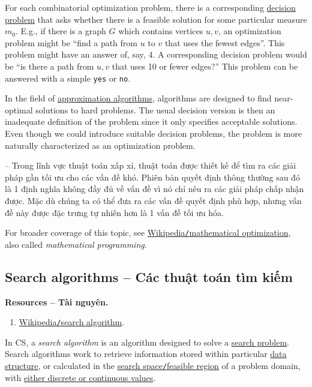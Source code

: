 \documentclass{article}
\begin{document}
For each combinatorial optimization problem, there is a corresponding \href{https://en.wikipedia.org/wiki/Decision_problem}{decision problem} that asks whether there is a feasible solution for some particular measure $m_0$. E.g., if there is a graph $G$ which contains vertices $u,v$, an optimization problem might be ``find a path from $u$ to $v$ that uses the fewest edges''. This problem might have an answer of, say, 4. A corresponding decision problem would be ``is there a path from $u,v$ that uses 10 or fewer edges?'' This problem can be answered with a simple {\tt yes} or {\tt no}.

In the field of \href{https://en.wikipedia.org/wiki/Approximation_algorithm}{approximation algorithms}, algorithms are designed to find near-optimal solutions to hard problems. The usual decision version is then an inadequate definition of the problem since it only specifies acceptable solutions. Even though we could introduce suitable decision problems, the problem is more naturally characterized as an optimization problem.

-- Trong lĩnh vực thuật toán xấp xỉ, thuật toán được thiết kế để tìm ra các giải pháp gần tối ưu cho các vấn đề khó. Phiên bản quyết định thông thường sau đó là 1 định nghĩa không đầy đủ về vấn đề vì nó chỉ nêu ra các giải pháp chấp nhận được. Mặc dù chúng ta có thể đưa ra các vấn đề quyết định phù hợp, nhưng vấn đề này được đặc trưng tự nhiên hơn là 1 vấn đề tối ưu hóa.

For broader coverage of this topic, see \href{https://en.wikipedia.org/wiki/Mathematical_optimization}{Wikipedia{\tt/}mathematical optimization}, also called {\it mathematical programming}.


\subsection{Search algorithms -- Các thuật toán tìm kiếm}
\textbf{\textsf{Resources -- Tài nguyên.}}
\begin{enumerate}
	\item \href{https://en.wikipedia.org/wiki/Search_algorithm}{Wikipedia{\tt/}search algorithm}.
\end{enumerate}
In CS, a {\it search algorithm} is an algorithm designed to solve a \href{https://en.wikipedia.org/wiki/Search_problem}{search problem}. Search algorithms work to retrieve information stored within particular \href{https://en.wikipedia.org/wiki/Data_structure}{data structure}, or calculated in the \href{https://en.wikipedia.org/wiki/Feasible_region}{search space{\tt/}feasible region} of a problem domain, with \href{https://en.wikipedia.org/wiki/Continuous_or_discrete_variable}{either discrete or continuous values}.
\end{document}
